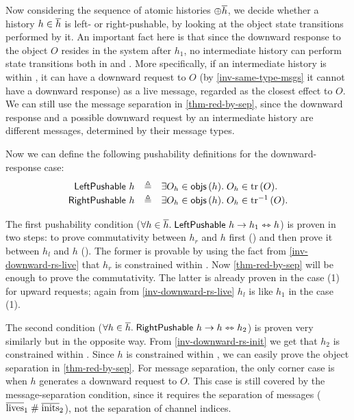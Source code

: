 Now considering the sequence of atomic histories $\oplus \overline{h}$, we decide whether a history $h \in \overline{h}$ is left- or right-pushable, by looking at the object state transitions performed by it.
An important fact here is that since the downward response to the object $O$ resides in the system after $h_1$, no intermediate history can perform state transitions both in  and .
More specifically, if an intermediate history is within , it can have a downward request to $O$ (by \autoref{inv-same-type-msgs} it cannot have a downward response) as a live message, regarded as the closest effect to $O$.
We can still use the message separation in \autoref{thm-red-by-sep}, since the downward response and a possible downward request by an intermediate history are different messages, determined by their message types.

Now we can define the following pushability definitions for the downward-response case:
\begin{displaymath}
  \renewcommand{\arraystretch}{1.2}
  \begin{array}{rcl}
    \mathsf{LeftPushable}\ h & \triangleq & \exists O_h \in \aobjs{h}.\; O_h \in \subtree{O}.\\
    \mathsf{RightPushable}\ h & \triangleq & \exists O_h \in \aobjs{h}.\; O_h \in \subtreec{O}.
  \end{array}
\end{displaymath}

The first pushability condition ($\forall h \in \overline{h}.\; \mathsf{LeftPushable}\ h \to h_1 \leftrightarrowtriangle h$) is proven in two steps: to prove commutativity between $h_r$ and $h$ first () and then prove it between $h_l$ and $h$ ().
The former is provable by using the fact from \autoref{inv-downward-rs-live} that $h_r$ is constrained within .
Now \autoref{thm-red-by-sep} will be enough to prove the commutativity.
The latter is already proven in the case (1) for upward requests; again from \autoref{inv-downward-rs-live} $h_l$ is like $h_1$ in the case (1).

The second condition ($\forall h \in \overline{h}.\; \mathsf{RightPushable}\ h \to h \leftrightarrowtriangle h_2$) is proven very similarly but in the opposite way.
From \autoref{inv-downward-rs-init} we get that $h_2$ is constrained within .
Since $h$ is constrained within , we can easily prove the object separation in \autoref{thm-red-by-sep}.
For message separation, the only corner case is when $h$ generates a downward request to $O$.
This case is still covered by the message-separation condition, since it requires the separation of messages ($\overline{\mathrm{lives}}_1 \; \# \; \overline{\mathrm{inits}}_2$), not the separation of channel indices.

